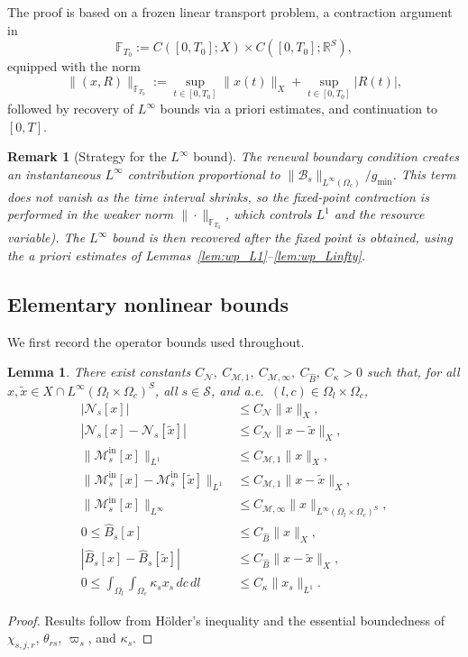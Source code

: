 \documentclass[pdflatex,sn-mathphys-num]{sn-jnl}%
\newtheorem{lemma}[theorem]{Lemma}
\newtheorem{remark}[theorem]{Remark}
\begin{document}
The proof is based on a frozen linear transport problem, a contraction argument in
\[
\mathbb F_{T_0}
:=
C([0,T_0];X)\times C([0,T_0];\mathbb R^S),
\]
equipped with the norm
\[
\|(x,R)\|_{\mathbb F_{T_0}}
:=
\sup_{t\in[0,T_0]}\|x(t)\|_X
+\sup_{t\in[0,T_0]}|R(t)|,
\]
followed by recovery of \(L^\infty\) bounds via a priori estimates, and continuation to
\([0,T]\).

\begin{remark}[Strategy for the \(L^\infty\) bound]\label{rem:Linfty_strategy}
The renewal boundary condition creates an instantaneous \(L^\infty\) contribution
proportional to \(\|\mathcal B_s\|_{L^\infty(\Omega_c)}/g_{\min}\).
This term does not
vanish as the time interval shrinks, so the fixed-point contraction is performed in the
weaker norm \(\|\cdot\|_{\mathbb F_{T_0}}\), which controls \(L^1\) and the resource
variable). 
The \(L^\infty\) bound is then recovered \emph{after} the fixed point is
obtained, using the a priori estimates of Lemmas~\ref{lem:wp_L1}--\ref{lem:wp_Linfty}.
\end{remark}

\subsection{Elementary nonlinear bounds}
We first record the operator bounds used throughout.
\begin{lemma}\label{lem:wp_operator_bounds}
There exist constants
\(C_{\mathcal N},\ C_{\mathcal M,1},\ C_{\mathcal M,\infty},\ C_{\widehat B},\ C_\kappa>0\)
such that, for all \(x,\widetilde x\in X\cap L^\infty(\Omega_l\times\Omega_c)^S\),
all \(s\in\mathcal S\), and a.e.\ \((l,c)\in\Omega_l\times\Omega_c\),
\begin{align}
|\mathcal N_s[x]| &\le C_{\mathcal N}\|x\|_X, \label{eq:wp_N_bound}\\
|\mathcal N_s[x]-\mathcal N_s[\widetilde x]|
&\le C_{\mathcal N}\|x-\widetilde x\|_X, \label{eq:wp_N_Lip}\\
\|\mathcal M_s^{\mathrm{in}}[x]\|_{L^1}
&\le C_{\mathcal M,1}\|x\|_X, \label{eq:wp_Min_L1}\\
\|\mathcal M_s^{\mathrm{in}}[x]-\mathcal M_s^{\mathrm{in}}[\widetilde x]\|_{L^1}
&\le C_{\mathcal M,1}\|x-\widetilde x\|_X, \label{eq:wp_Min_L1_Lip}\\
\|\mathcal M_s^{\mathrm{in}}[x]\|_{L^\infty}
&\le C_{\mathcal M,\infty}\|x\|_{L^\infty(\Omega_l\times\Omega_c)^S},
\label{eq:wp_Min_Linfty}\\
0\le \widehat B_s[x] &\le C_{\widehat B}\|x\|_X, \label{eq:wp_Bhat_bound}\\
|\widehat B_s[x]-\widehat B_s[\widetilde x]|
&\le C_{\widehat B}\|x-\widetilde x\|_X, \label{eq:wp_Bhat_Lip}\\
0\le \int_{\Omega_l}\!\int_{\Omega_c}\kappa_s x_s\,dc\,dl
&\le C_\kappa \|x_s\|_{L^1}.
\label{eq:wp_kappa_bound}
\end{align}
\end{lemma}
\begin{proof}
Results follow from Hölder's inequality and the essential boundedness of
\(\chi_{s,j,r}\), \(\theta_{rs}\), \(\varpi_s\), and \(\kappa_s\).
\end{proof}
\end{document}
